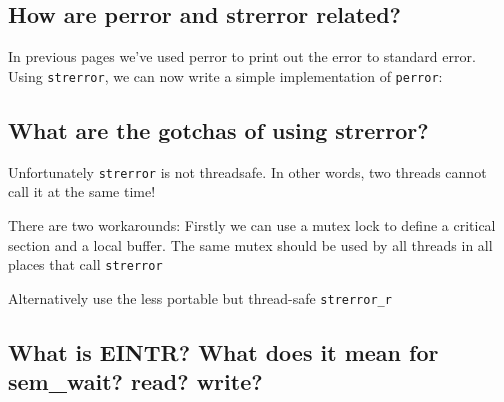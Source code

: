 \subsection{How are perror and strerror
related?}\label{how-are-perror-and-strerror-related}

In previous pages we've used perror to print out the error to standard
error. Using \texttt{strerror}, we can now write a simple implementation
of \texttt{perror}:

\begin{Shaded}
\end{Shaded}

\subsection{What are the gotchas of using
strerror?}\label{what-are-the-gotchas-of-using-strerror}

Unfortunately \texttt{strerror} is not threadsafe. In other words, two
threads cannot call it at the same time!

There are two workarounds: Firstly we can use a mutex lock to define a
critical section and a local buffer. The same mutex should be used by
all threads in all places that call \texttt{strerror}

\begin{Shaded}
\end{Shaded}

Alternatively use the less portable but thread-safe \texttt{strerror\_r}

\subsection{What is EINTR? What does it mean for sem\_wait? read?
write?}\label{what-is-eintr-what-does-it-mean-for-semux5fwait-read-write}

